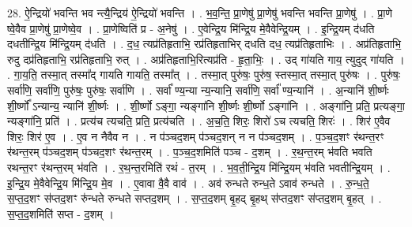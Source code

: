 \documentclass[17pt]{extarticle}
\begin{document}
28. ऐ॒न्द्रियो॑ भवन्ति भव न्त्यै॒न्द्रिय॑ ऐ॒न्द्रियो॑ भवन्ति । . भ॒व॒न्ति॒ प्रा॒णेषु॑ प्रा॒णेषु॑ भवन्ति भवन्ति प्रा॒णेषु॑ । . प्रा॒णे ष्वे॒वैव प्रा॒णेषु॑ प्रा॒णेष्वे॒व । . प्रा॒णेष्विति॑ प्र - अ॒नेषु॑ । . ए॒वेन्द्रि॒य मि॑न्द्रि॒य मे॒वैवेन्द्रि॒यम् । . इ॒न्द्रि॒यम् द॑धति दधतीन्द्रि॒य मि॑न्द्रि॒यम् द॑धति । . द॒ध॒ त्यप्र॑तिहृताभि॒ रप्र॑तिहृताभिर् दधति दध॒ त्यप्र॑तिहृताभिः । . अप्र॑तिहृताभि॒ रुदु दप्र॑तिहृताभि॒ रप्र॑तिहृताभि॒ रुत् । . अप्र॑तिहृताभि॒रित्यप्र॑ति - हृ॒ता॒भिः॒ । . उद् गा॑यति गाय॒ त्युदुद् गा॑यति । . गा॒य॒ति॒ तस्मा॒त् तस्मा᳚द् गायति गायति॒ तस्मा᳚त् । . तस्मा॒त् पुरु॑षः॒ पुरु॑ष॒ स्तस्मा॒त् तस्मा॒त् पुरु॑षः । . पुरु॑षः॒ सर्वा॑णि॒ सर्वा॑णि॒ पुरु॑षः॒ पुरु॑षः॒ सर्वा॑णि । . सर्वा᳚ ण्य॒न्या न्य॒न्यानि॒ सर्वा॑णि॒ सर्वा᳚ ण्य॒न्यानि॑ । . अ॒न्यानि॑ शी॒र्ष्णः शी॒र्ष्णो᳚ ऽन्यान्य॒ न्यानि॑ शी॒र्ष्णः । . शी॒र्ष्णो ऽङ्गा॒ न्यङ्गा॑नि शी॒र्ष्णः शी॒र्ष्णो ऽङ्गा॑नि । . अङ्गा॑नि॒ प्रति॒ प्रत्यङ्गा॒ न्यङ्गा॑नि॒ प्रति॑ । . प्रत्य॑च त्यचति॒ प्रति॒ प्रत्य॑चति । . अ॒च॒ति॒ शिरः॒ शिरो॑ ऽच त्यचति॒ शिरः॑ । . शिर॑ ए॒वैव शिरः॒ शिर॑ ए॒व । . ए॒व न नैवैव न । . न प॑ञ्चद॒शम् प॑ञ्चद॒शन् न न प॑ञ्चद॒शम् । . प॒ञ्च॒द॒शꣳ र॑थन्त॒रꣳ र॑थन्त॒रम् प॑ञ्चद॒शम् प॑ञ्चद॒शꣳ र॑थन्त॒रम् । . प॒ञ्च॒द॒शमिति॑ पञ्च - द॒शम् । . र॒थ॒न्त॒रम् भ॑वति भवति रथन्त॒रꣳ र॑थन्त॒रम् भ॑वति । . र॒थ॒न्त॒रमिति॑ रथं - त॒रम् । . भ॒व॒ती॒न्द्रि॒य मि॑न्द्रि॒यम् भ॑वति भवतीन्द्रि॒यम् । . इ॒न्द्रि॒य मे॒वैवेन्द्रि॒य मि॑न्द्रि॒य मे॒व । . ए॒वावा वै॒वै वाव॑ । . अव॑ रुन्धते रुन्ध॒ते ऽवाव॑ रुन्धते । . रु॒न्ध॒ते॒ स॒प्त॒द॒शꣳ स॑प्तद॒शꣳ रु॑न्धते रुन्धते सप्तद॒शम् । . स॒प्त॒द॒शम् बृ॒हद् बृ॒हथ् स॑प्तद॒शꣳ स॑प्तद॒शम् बृ॒हत् । . स॒प्त॒द॒शमिति॑ सप्त - द॒शम् । \newline
\end{document}
